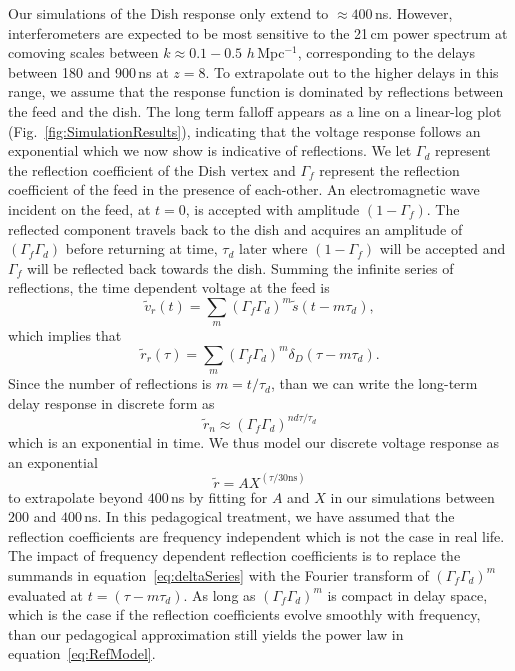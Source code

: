 \documentclass[twocolumn]{emulateapj}
\begin{document}
Our simulations of the Dish response only extend to $\approx 400$\,ns. However, interferometers are expected to be most sensitive to the 21\,cm power spectrum at comoving scales between $k\approx 0.1-0.5$ $h$\,Mpc$^{-1}$, corresponding to the delays between 180 and 900\,ns at $z=8$. To extrapolate out to the higher delays in this range, we assume that the response function is dominated by reflections between the feed and the dish. The long term falloff appears as a line on a linear-log plot (Fig.~\ref{fig:SimulationResults}), indicating that the voltage response follows an exponential which we now show is indicative of reflections. We let $\Gamma_d$ represent the reflection coefficient of the Dish vertex and $\Gamma_f$ represent the reflection coefficient of the feed in the presence of each-other. An electromagnetic wave incident on the feed, at $t=0$, is accepted with amplitude $(1-\Gamma_f)$. The reflected component travels back to the dish and acquires an amplitude of $(\Gamma_f \Gamma_d)$ before returning at time, $\tau_d$ later where $(1-\Gamma_f)$ will be accepted and $\Gamma_f$ will be reflected back towards the dish. Summing the infinite series of reflections, the time dependent voltage at the feed is
\begin{equation}
\widetilde{v}_r(t) = \sum_m \left( \Gamma_f \Gamma_d \right)^m \widetilde{s}(t-m \tau_d),
\end{equation}
which implies that
\begin{equation}\label{eq:deltaSeries}
\widetilde{r}_r(\tau) = \sum_m \left( \Gamma_f \Gamma_d \right)^m \delta_D(\tau-m\tau_d).
\end{equation}
Since the number of reflections is $m=t/\tau_d$, than we can write the long-term delay response in discrete form as 
\begin{equation}
\widetilde{r}_n \approx (\Gamma_f \Gamma_d)^{n d\tau/\tau_d}
\end{equation}
which is an exponential in time. We thus model our discrete voltage response as an exponential
\begin{equation}\label{eq:RefModel}
\widetilde{r} = A X^{(\tau/30\text{ns})} 
\end{equation}
to extrapolate beyond $400$\,ns by fitting for $A$ and $X$ in our simulations between $200$ and $400$\,ns. In this pedagogical treatment, we have assumed that the reflection coefficients are frequency independent which is not the case in real life. The impact of frequency dependent reflection coefficients is to replace the summands in equation~\ref{eq:deltaSeries} with the Fourier transform of $(\Gamma_f\Gamma_d)^m$ evaluated at $t=(\tau - m \tau_d)$. As long as $(\Gamma_f\Gamma_d)^m$ is compact in delay space, which is the case if the reflection coefficients evolve smoothly with frequency, than our pedagogical approximation still yields the power law in equation~\ref{eq:RefModel}.
\end{document}
